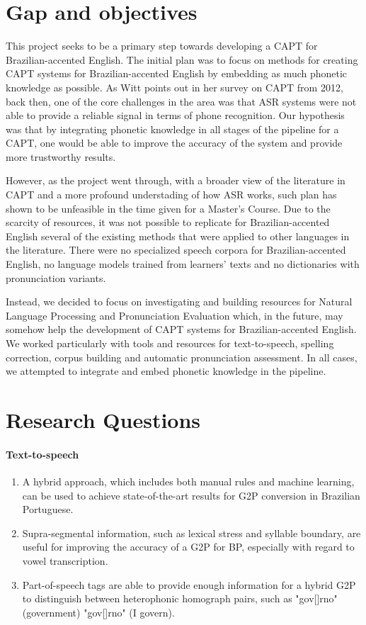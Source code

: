 \section*{Gap and objectives} 

This project seeks to be a primary step towards developing a \ac{CAPT} for Brazilian-accented English. The initial plan was to focus on methods for creating \ac{CAPT} systems for Brazilian-accented English by embedding as much phonetic knowledge as possible. As Witt \citep{Witt2012} points out in her survey on \ac{CAPT} from 2012, back then, one of the core challenges in the area was that \ac{ASR} systems were not able to provide a reliable signal in terms of phone recognition. Our hypothesis was that by integrating phonetic knowledge in all stages of the pipeline for a \ac{CAPT}, one would be able to improve the accuracy of the system and provide more trustworthy results.

However, as the project went through, with a broader view of the literature in \ac{CAPT} and a more profound understading of how \ac{ASR} works, such plan has shown to be unfeasible in the time given for a Master's Course. Due to the scarcity of resources, it was not possible to replicate for Brazilian-accented English several of the existing methods that were applied to other languages in the literature. There were no specialized speech corpora for Brazilian-accented English, no language models trained from learners' texts and no dictionaries with pronunciation variants.

Instead, we decided to focus on investigating and building resources for Natural Language Processing and Pronunciation Evaluation which, in the future, may somehow help the development of \ac{CAPT} systems for Brazilian-accented English. We worked particularly with tools and resources for text-to-speech, spelling correction, corpus building and automatic pronunciation assessment. In all cases, we attempted to integrate and embed phonetic knowledge in the pipeline.

\section*{Research Questions}

\paragraph*{Text-to-speech}
  \begin{enumerate}
    \item A hybrid approach, which includes both manual rules and machine learning, can be used to achieve state-of-the-art results for \ac{G2P} conversion in Brazilian Portuguese.
    \item Supra-segmental information, such as lexical stress and syllable boundary, are useful for improving the accuracy of a \ac{G2P} for \ac{BP}, especially with regard to vowel transcription.
    \item Part-of-speech tags are able to provide enough information for a hybrid \ac{G2P} to distinguish between heterophonic homograph pairs, such as "gov[]rno" (government) "gov[]rno" (I govern).
  \end{enumerate}

